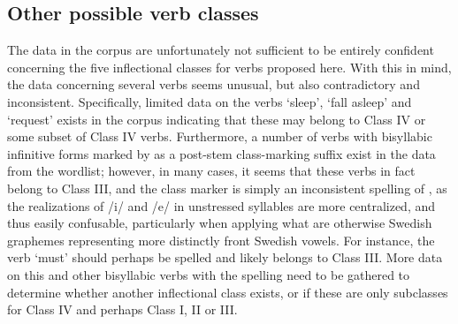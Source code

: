 \subsection{Other possible verb classes}\label{otherVerbClasses}
The data in the corpus are unfortunately not sufficient to be entirely confident concerning the five inflectional classes for verbs proposed here. With this in mind, the data concerning several verbs seems unusual, but also contradictory and inconsistent. Specifically, limited data on the verbs  ‘sleep’,  ‘fall asleep’  %
and  ‘request’ %
exists in the corpus indicating that these may belong to Class IV or some subset of Class IV verbs. Furthermore, a number of verbs with bisyllabic infinitive forms marked by  as a post-stem class-marking suffix exist in the data from the wordlist; however, in many cases, it seems that these verbs in fact belong to Class III, and the  class marker is simply an inconsistent spelling of , as the realizations of /i/ and /e/ in unstressed syllables are more centralized, and thus easily confusable, particularly when applying what are otherwise Swedish graphemes representing more distinctly front Swedish vowels. For instance, the verb  ‘must’ should perhaps be spelled  and likely belongs to Class III. More data on this and other bisyllabic verbs with the  spelling need to be gathered to determine whether another inflectional class exists, or if these are only subclasses for Class IV and perhaps Class I, II or III. 



